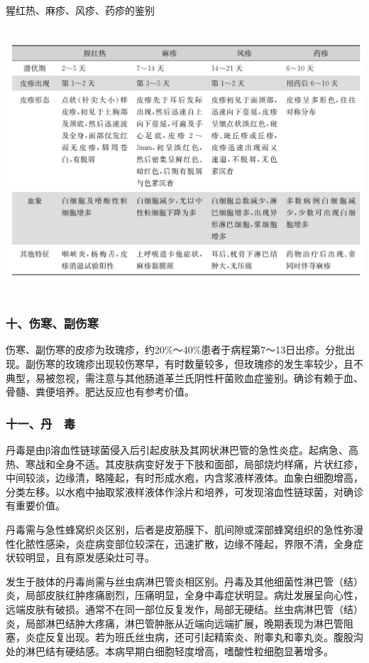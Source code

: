 \begin{table}[htbp]
\centering
\caption{猩红热、麻疹、风疹、药疹的鉴别}
\label{tab2-7}
\includegraphics[width=5.97917in,height=3.92708in]{./images/Image00011.jpg}
\end{table}

\subsubsection{十、伤寒、副伤寒}

伤寒、副伤寒的皮疹为玫瑰疹，约20\%～40\%患者于病程第7～13日出疹。分批出现。副伤寒的玫瑰疹出现较伤寒早，有时数量较多，但玫瑰疹的发生率较少，且不典型，易被忽视，需注意与其他肠道革兰氏阴性杆菌败血症鉴别。确诊有赖于血、骨髓、粪便培养。肥达反应也有参考价值。

\subsubsection{十一、丹　毒}

丹毒是由β溶血性链球菌侵入后引起皮肤及其网状淋巴管的急性炎症。起病急、高热、寒战和全身不适。其皮肤病变好发于下肢和面部，局部烧灼样痛，片状红疹，中间较淡，边缘清，略隆起，有时形成水疱，内含浆液样液体。血象白细胞增高，分类左移。以水疱中抽取浆液样液体作涂片和培养，可发现溶血性链球菌，对确诊有重要价值。

丹毒需与急性蜂窝织炎区别，后者是皮筋膜下、肌间隙或深部蜂窝组织的急性弥漫性化脓性感染，炎症病变部位较深在，迅速扩散，边缘不隆起，界限不清，全身症状较明显，且有原发感染灶可寻。

发生于肢体的丹毒尚需与丝虫病淋巴管炎相区别。丹毒及其他细菌性淋巴管（结）炎，局部皮肤红肿疼痛剧烈，压痛明显，全身中毒症状明显。病灶发展呈向心性，远端皮肤有破损。通常不在同一部位反复发作，局部无硬结。丝虫病淋巴管（结）炎，局部淋巴结肿大疼痛，淋巴管肿胀从近端向远端扩展，晚期表现为淋巴管阻塞，炎症反复出现。若为班氏丝虫病，还可引起精索炎、附睾丸和睾丸炎。腹股沟处的淋巴结有硬结感。本病早期白细胞轻度增高，嗜酸性粒细胞显著增多。

